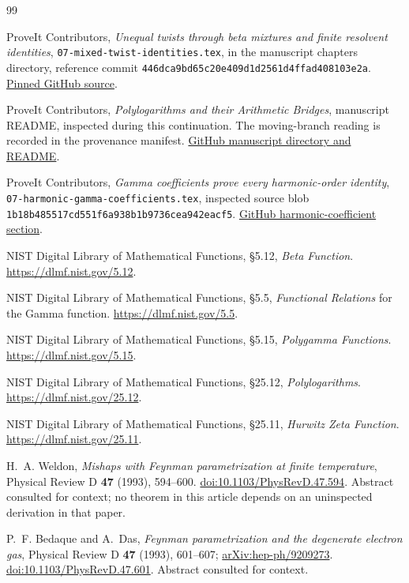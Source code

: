 \documentclass[11pt,letterpaper]{article}
\numberwithin{equation}{section}
\theoremstyle{definition}
\theoremstyle{remark}
\begin{document}
\begin{thebibliography}{99}
\raggedright
{}
ProveIt Contributors,
\emph{Unequal twists through beta mixtures and finite resolvent identities},
\texttt{07-mixed-twist-identities.tex}, in the manuscript chapters directory,
reference commit \texttt{446dca9bd65c20e409d1d2561d4ffad408103e2a}.
\href{https://github.com/VladimirReshetnikov/ProveIt/blob/446dca9bd65c20e409d1d2561d4ffad408103e2a/Analysis/Polylogarithms/docs/manuscript/chapters/07-mixed-twist-identities.tex}{Pinned GitHub source}.

ProveIt Contributors,
\emph{Polylogarithms and their Arithmetic Bridges}, manuscript README,
inspected during this continuation. The moving-branch reading is
recorded in the provenance manifest.
\href{https://github.com/VladimirReshetnikov/ProveIt/tree/main/Analysis/Polylogarithms/docs/manuscript}{GitHub manuscript directory and README}.

ProveIt Contributors,
\emph{Gamma coefficients prove every harmonic-order identity},
\texttt{07-harmonic-gamma-coefficients.tex}, inspected source blob
\texttt{1b18b485517cd551f6a938b1b9736cea942eacf5}.
\href{https://github.com/VladimirReshetnikov/ProveIt/blob/main/Analysis/Polylogarithms/docs/manuscript/chapters/07-harmonic-gamma-coefficients.tex}{GitHub harmonic-coefficient section}.

NIST Digital Library of Mathematical Functions,
\S5.12, \emph{Beta Function}.
\url{https://dlmf.nist.gov/5.12}.

NIST Digital Library of Mathematical Functions,
\S5.5, \emph{Functional Relations} for the Gamma function.
\url{https://dlmf.nist.gov/5.5}.

NIST Digital Library of Mathematical Functions,
\S5.15, \emph{Polygamma Functions}.
\url{https://dlmf.nist.gov/5.15}.

NIST Digital Library of Mathematical Functions,
\S25.12, \emph{Polylogarithms}.
\url{https://dlmf.nist.gov/25.12}.

NIST Digital Library of Mathematical Functions,
\S25.11, \emph{Hurwitz Zeta Function}.
\url{https://dlmf.nist.gov/25.11}.

H.~A. Weldon,
\emph{Mishaps with Feynman parametrization at finite temperature},
Physical Review D \textbf{47} (1993), 594--600.
\href{https://doi.org/10.1103/PhysRevD.47.594}{doi:10.1103/PhysRevD.47.594}.
Abstract consulted for context; no theorem in this article depends on
an uninspected derivation in that paper.

P.~F. Bedaque and A.~Das,
\emph{Feynman parametrization and the degenerate electron gas},
Physical Review D \textbf{47} (1993), 601--607;
\href{https://arxiv.org/abs/hep-ph/9209273}{arXiv:hep-ph/9209273}.
\href{https://doi.org/10.1103/PhysRevD.47.601}{doi:10.1103/PhysRevD.47.601}.
Abstract consulted for context.
\end{thebibliography}
\end{document}
